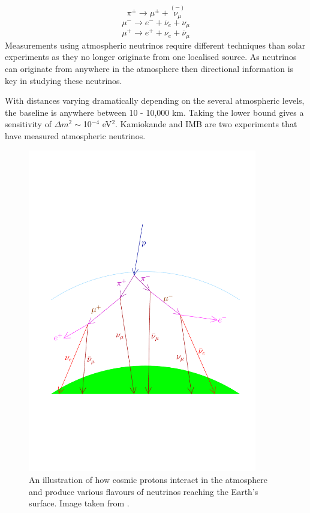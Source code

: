 \begin{equation}
	\pi^{\pm} \rightarrow \mu^{\pm} + \overset{(-)}{\nu_{\mu}}
	\label{eq:pionDecay}
\end{equation}
\vspace{-6mm}
\begin{equation}
	\mu^{-}  \rightarrow e^{-} + \overline{\nu}_{e} + \nu_{\mu} 
	\label{eq:muonDecay1}
\end{equation}
\vspace{-6mm}
\begin{equation}
	\mu^{+}  \rightarrow e^{+} + {\nu_{e}} + \overline{\nu}_{\mu}
	\label{eq:muonDecay2}
\end{equation}
Measurements using atmospheric neutrinos require different techniques than solar experiments as they no longer originate from one localised source. As neutrinos can originate from anywhere in the atmosphere then directional information is key in studying these neutrinos.

With distances varying dramatically depending on the several atmospheric levels, the baseline is anywhere between 10 - 10,000 km. Taking the lower bound gives a sensitivity of $\Delta m^{2} \sim$10$^{-4}$ eV$^{2}$. Kamiokande \cite{kamiokandeExperiment} and IMB \cite{imbExperiment} are two experiments that have measured atmospheric neutrinos.

\begin{figure}[htbp]
\begin{center}
\includegraphics[width=100mm]{Introduction/IntroductionFigs/atmosNuOriginDiagram.pdf}
\caption{An illustration of how cosmic protons interact in the atmosphere and produce various flavours of neutrinos reaching the Earth's surface. Image taken from \cite{giuntiNeutrino}.}
\label{fig:atmosNeutrinoDiagram}
\end{center}
\end{figure}

